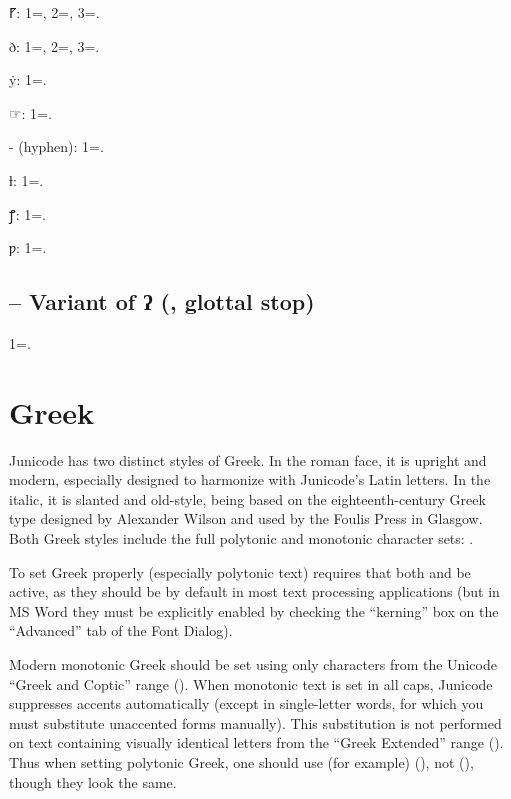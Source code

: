\begin{multicols}{2}
\color{GGOrange} ⹍: 1=, 2=, 3=.

{ð: 1=, 2=, 3=.}

ẏ: 1=.

☞: 1=.

- (hyphen): 1=.

ƚ: 1=.

ꝭ: 1=.

ƿ: 1=.
\end{multicols}


\subsection{ – Variant of ʔ (, glottal stop)}
1=.

\section{Greek}
Junicode has two distinct styles of Greek. In the roman face, it is upright and
modern, especially designed to harmonize with Junicode's Latin letters. In the
italic, it is slanted and old-style, being based on the eighteenth-century
Greek type designed by Alexander Wilson and used by the Foulis Press in
Glasgow. Both Greek styles include the full polytonic and monotonic character
sets: .

To set Greek properly (especially polytonic text) requires that both 
and  be active, as they should be by default in most
text processing applications (but in MS Word they must be explicitly enabled
by checking the “kerning” box on the “Advanced” tab of the Font Dialog).

Modern monotonic Greek should be set using only characters from the Unicode “Greek
and Coptic” range (). When monotonic text is set in all caps, Junicode
suppresses accents automatically (except in single-letter words, for which
you must substitute unaccented forms manually). This substitution is not
performed on text containing visually identical letters from the “Greek Extended”
range ().
Thus when setting polytonic Greek, one should use (for example) 
(), not  (),
though they look the same.

